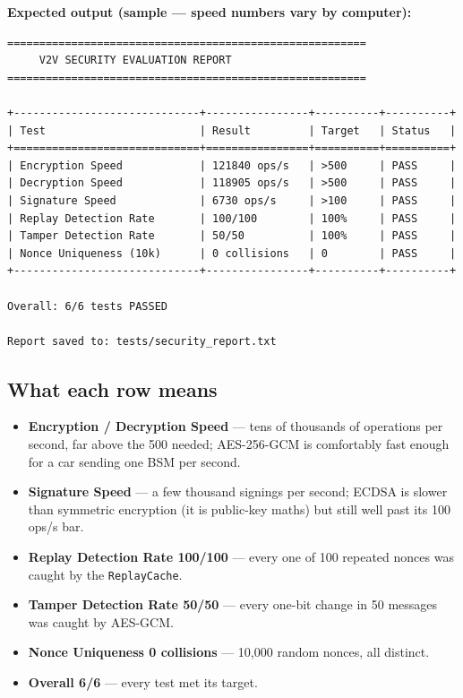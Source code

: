 \documentclass[11pt,a4paper]{report}
\begin{document}
\noindent\textbf{Expected output (sample --- speed numbers vary by computer):}
\begin{lstlisting}[style=term]
========================================================
     V2V SECURITY EVALUATION REPORT
========================================================

+-----------------------------+----------------+----------+----------+
| Test                        | Result         | Target   | Status   |
+=============================+================+==========+==========+
| Encryption Speed            | 121840 ops/s   | >500     | PASS     |
| Decryption Speed            | 118905 ops/s   | >500     | PASS     |
| Signature Speed             | 6730 ops/s     | >100     | PASS     |
| Replay Detection Rate       | 100/100        | 100%     | PASS     |
| Tamper Detection Rate       | 50/50          | 100%     | PASS     |
| Nonce Uniqueness (10k)      | 0 collisions   | 0        | PASS     |
+-----------------------------+----------------+----------+----------+

Overall: 6/6 tests PASSED

Report saved to: tests/security_report.txt
\end{lstlisting}

\subsection{What each row means}
\begin{itemize}
  \item \textbf{Encryption / Decryption Speed} --- tens of thousands of
        operations per second, far above the 500 needed; AES-256-GCM is
        comfortably fast enough for a car sending one BSM per second.
  \item \textbf{Signature Speed} --- a few thousand signings per second; ECDSA is
        slower than symmetric encryption (it is public-key maths) but still well
        past its 100 ops/s bar.
  \item \textbf{Replay Detection Rate 100/100} --- every one of 100 repeated
        nonces was caught by the \texttt{ReplayCache}.
  \item \textbf{Tamper Detection Rate 50/50} --- every one-bit change in 50
        messages was caught by AES-GCM.
  \item \textbf{Nonce Uniqueness 0 collisions} --- 10{,}000 random nonces, all
        distinct.
  \item \textbf{Overall 6/6} --- every test met its target.
\end{itemize}
\end{document}
